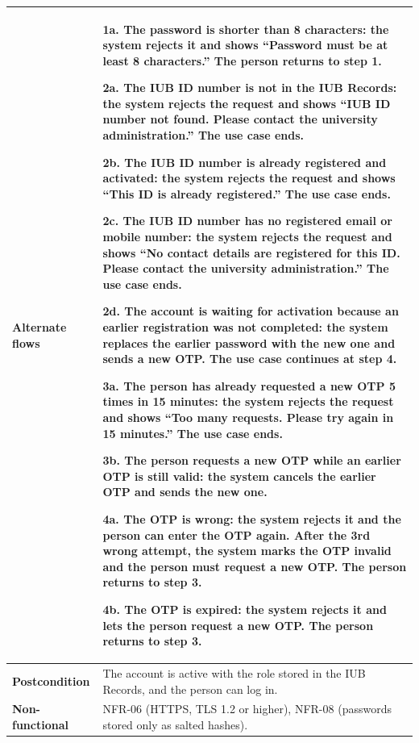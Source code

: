 \documentclass[11pt,a4paper]{report}
\begin{document}
\begin{longtable}{|>{\raggedright\arraybackslash}p{3.0cm}|>{\raggedright\arraybackslash}p{12.4cm}|}
\textbf{Alternate flows} & 1a. The password is shorter than 8 characters: the system rejects it and shows ``Password must be at least 8 characters.'' The person returns to step 1.\par\smallskip 2a. The IUB ID number is not in the IUB Records: the system rejects the request and shows ``IUB ID number not found. Please contact the university administration.'' The use case ends.\par\smallskip 2b. The IUB ID number is already registered and activated: the system rejects the request and shows ``This ID is already registered.'' The use case ends.\par\smallskip 2c. The IUB ID number has no registered email or mobile number: the system rejects the request and shows ``No contact details are registered for this ID. Please contact the university administration.'' The use case ends.\par\smallskip 2d. The account is waiting for activation because an earlier registration was not completed: the system replaces the earlier password with the new one and sends a new OTP. The use case continues at step 4.\par\smallskip 3a. The person has already requested a new OTP 5 times in 15 minutes: the system rejects the request and shows ``Too many requests. Please try again in 15 minutes.'' The use case ends.\par\smallskip 3b. The person requests a new OTP while an earlier OTP is still valid: the system cancels the earlier OTP and sends the new one.\par\smallskip 4a. The OTP is wrong: the system rejects it and the person can enter the OTP again. After the 3rd wrong attempt, the system marks the OTP invalid and the person must request a new OTP. The person returns to step 3.\par\smallskip 4b. The OTP is expired: the system rejects it and lets the person request a new OTP. The person returns to step 3. \\ \hline
\textbf{Postcondition} & The account is active with the role stored in the IUB Records, and the person can log in. \\ \hline
\textbf{Non-functional} & NFR-06 (HTTPS, TLS 1.2 or higher), NFR-08 (passwords stored only as salted hashes). \\ \hline
\end{longtable}
\end{document}

